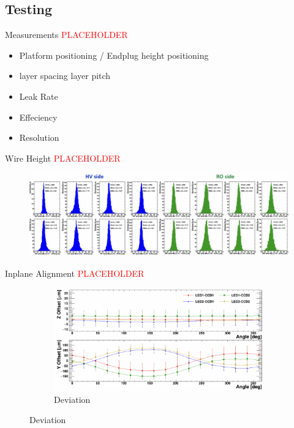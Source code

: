 \documentclass{beamer}
\def\ph{\textcolor{red}{PLACEHOLDER}}
\begin{document}
	\subsection{Testing}

		\begin{frame}{Measurements \ph}
			\begin{itemize}
				\item Platform positioning / Endplug height positioning
				\item layer spacing layer pitch
				\item Leak Rate
				\item Effeciency
				\item Resolution
			\end{itemize}
		\end{frame}
		\begin{frame}{Wire Height \ph}
			\begin{figure}
				\centering
				\includegraphics[width=0.8\pdfpagewidth]{WireHeightOffset.png}
			\end{figure}
		\end{frame}
		\begin{frame}{Inplane Alignment \ph}
			\begin{figure}[t]
				\centering	
				\begin{subfigure}[b]{0.4\pdfpagewidth}
					\includegraphics[width=0.4\pdfpagewidth]{RASNIKMeasurements.png}
					\caption{Deviation}
					\label{fig:InplaneAlignment}
				\end{subfigure}
			\end{figure}
		\end{frame}
\end{document}
